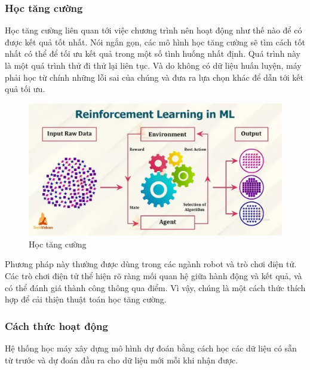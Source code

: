 \subsubsection{Học tăng cường}
Học tăng cường liên quan tới việc chương trình nên hoạt động như thế nào để có được kết quả tốt nhất. Nói ngắn gọn, các mô hình học tăng cường sẽ tìm cách tốt nhất có thể để tối ưu kết quả trong một số tình huống nhất định. Quá trình này là một quá trình thử đi thử lại liên tục. Và do không có dữ liệu huấn luyện, máy phải học từ chính những lỗi sai của chúng và đưa ra lựa chọn khác để dẫn tới kết quả tối ưu.
\begin{figure}[htb]
    \centering
    \includegraphics[width=\textwidth]{image/reinforcement-learning.jpg}
    \caption[Học tăng cường]{Học tăng cường\footnotemark}
    \label{figure:reinforcement-learning}
\end{figure}

Phương pháp này thường được dùng trong các ngành robot và trò chơi điện tử. Các trò chơi điện tử thể hiện rõ ràng mối quan hệ giữa hành động và kết quả, và có thể đánh giá thành công thông qua điểm. Vì vậy, chúng là một cách thức thích hợp để cải thiện thuật toán học tăng cường.

\subsubsection{Cách thức hoạt động}
Hệ thống học máy xây dựng mô hình dự đoán bằng cách học các dữ liệu có sẵn từ trước và dự đoán đầu ra cho dữ liệu mới mỗi khi nhận được.

